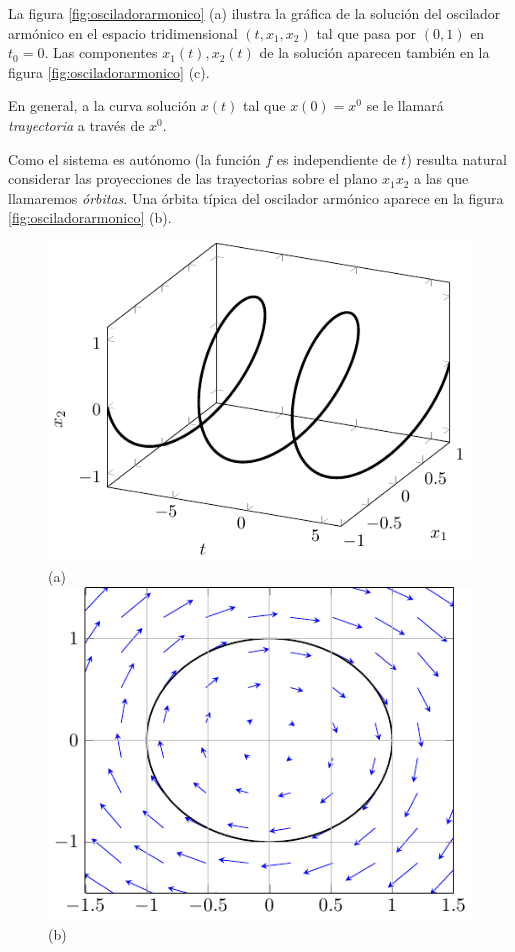 La figura \ref{fig:osciladorarmonico} (a) ilustra la gráfica de la solución del oscilador armónico en el espacio tridimensional $(t,x_1,x_2)$ tal que pasa por $(0,1)$ en $t_0 = 0$. Las componentes $x_1(t), x_2(t)$ de la solución aparecen también en la figura \ref{fig:osciladorarmonico} (c).

En general, a la curva solución $x(t)$ tal que $x(0) = x^0$ se le llamará \emph{trayectoria} a través de $x^0$.

Como el sistema es autónomo (la función $f$ es independiente de $t$) resulta natural considerar las proyecciones de las trayectorias sobre el plano $x_1x_2$ a las que llamaremos \emph{órbitas}. Una órbita típica del oscilador armónico aparece en la figura \ref{fig:osciladorarmonico} (b).

\begin{figure}
\centering
    \includegraphics[scale=1.0]{figures/osciladorarmonico-solucion.pdf}\\(a) \\
    \includegraphics[scale=1.0]{figures/osciladorarmonico-orbita.pdf}\\(b) \\ 

\end{figure}
